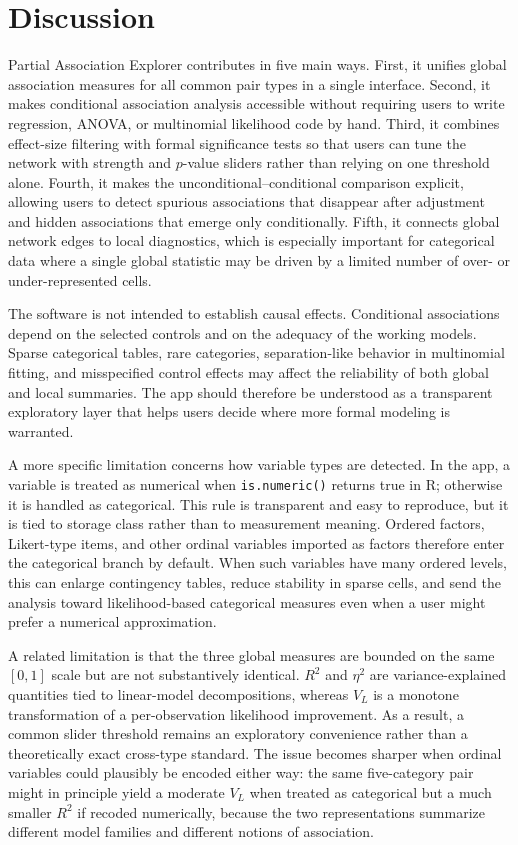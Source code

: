 \documentclass[11pt]{article}
\newcommand{\appname}{Partial Association Explorer}
\newcommand{\code}[1]{\texttt{#1}}
\newcommand{\proglang}[1]{\textsf{#1}}
\begin{document}
\section{Discussion}
\label{sec:discussion}

\appname{} contributes in five main ways. First, it unifies global association
measures for all common pair types in a single interface. Second, it makes
conditional association analysis accessible without requiring users to write
regression, ANOVA, or multinomial likelihood code by hand. Third, it combines
effect-size filtering with formal significance tests so that users can tune the
network with strength and $p$-value sliders rather than relying on one
threshold alone. Fourth, it makes the unconditional--conditional comparison
explicit, allowing users to detect spurious associations that disappear after
adjustment and hidden associations that emerge only conditionally. Fifth, it
connects global network edges to local diagnostics,
which is especially important for categorical data where a single global
statistic may be driven by a limited number of over- or under-represented
cells.

The software is not intended to establish causal effects. Conditional
associations depend on the selected controls and on the adequacy of the working
models. Sparse categorical tables, rare categories, separation-like behavior
in multinomial fitting, and misspecified control effects may affect the
reliability of both global and local summaries. The app should therefore be
understood as a transparent exploratory layer that helps users decide where
more formal modeling is warranted.

A more specific limitation concerns how variable types are detected.
In the app, a variable is treated as numerical when
\code{is.numeric()} returns true in \proglang{R}; otherwise it is handled as
categorical. This rule is transparent and easy to reproduce, but it is tied to
storage class rather than to measurement meaning. Ordered factors, Likert-type
items, and other ordinal variables imported as factors therefore enter the
categorical branch by default. When such variables have many ordered levels,
this can enlarge contingency tables, reduce stability in sparse cells, and send
the analysis toward likelihood-based categorical measures even when a user might
prefer a numerical approximation.

A related limitation is that the three global measures are bounded on the same
$[0,1]$ scale but are not substantively identical. $R^2$ and $\eta^2$ are
variance-explained quantities tied to linear-model decompositions, whereas
$V_L$ is a monotone transformation of a per-observation likelihood improvement.
As a result, a common slider threshold remains an exploratory convenience rather
than a theoretically exact cross-type standard. The issue becomes sharper when
ordinal variables could plausibly be encoded either way: the same five-category
pair might in principle yield a moderate $V_L$ when treated as categorical but
a much smaller $R^2$ if recoded numerically, because the two representations
summarize different model families and different notions of association.
\end{document}
